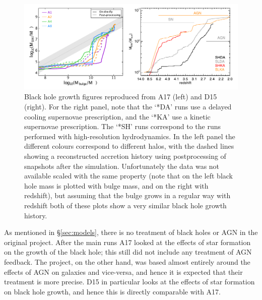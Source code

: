 \begin{figure}[!h]
  \includegraphics[width=\textwidth]{figures/comparisonfig.pdf}
    \caption{Black hole growth figures reproduced from A17 (left) and D15
    (right). For the right panel, note that the `*DA' runs use a delayed
    cooling supernovae prescription, and the `*KA' use a kinetic supernovae
    prescription. The `*SH' runs correspond to the runs performed with
    high-resolution hydrodynamics. In the left panel the different colours
    correspond to different halos, with the dashed lines showing a
    reconstructed accretion history using postprocessing of snapshots after the
    simulation. Unfortunately the data was not available scaled with the same
    property (note that on the left black hole mass is plotted with bulge mass,
    and on the right with redshift), but assuming that the bulge grows in a
    regular way with redshift both of these plots show a very similar black
    hole growth history.}
  \label{fig:bhhistory}
\end{figure}
As mentioned in §\ref{sec:models}, there is no treatment of black holes or AGN
in the original \fire{} project. After the main runs A17 looked at the effects
of star formation on the growth of the black hole; this still did not include
any treatment of AGN feedback. The \hagn{} project, on the other hand, was
based almost entirely around the effects of AGN on galaxies and vice-versa, and
hence it is expected that their treatment is more precise.  D15 in particular
looks at the effects of star formation on black hole growth, and hence this is
directly comparable with A17.

